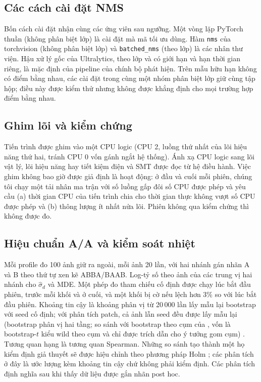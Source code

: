 \documentclass[a4paper,fleqn]{cas-dc}
\begin{document}
\subsection{Các cách cài đặt NMS}
Bốn cách cài đặt nhận cùng các ứng viên sau ngưỡng. Một vòng lặp PyTorch thuần (không phân biệt lớp) là cài đặt mà mã tối ưu dùng. Hàm \texttt{nms} của torchvision (không phân biệt lớp) và \texttt{batched\_nms} (theo lớp) là các nhân thư viện. Hậu xử lý gốc của Ultralytics, theo lớp và có giới hạn và hạn thời gian riêng, là mặc định của pipeline của chính bộ phát hiện. Trên mẫu hữu hạn không có điểm bằng nhau, các cài đặt trong cùng một nhóm phân biệt lớp giữ cùng tập hộp; điều này được kiểm thử nhưng không được khẳng định cho mọi trường hợp điểm bằng nhau.

\subsection{Ghim lõi và kiểm chứng}
Tiến trình được ghim vào một CPU logic (CPU 2, luồng thứ nhất của lõi hiệu năng thứ hai, tránh CPU 0 vốn gánh ngắt hệ thống). Ánh xạ CPU logic sang lõi vật lý, lõi hiệu năng hay tiết kiệm điện và SMT được đọc từ hệ điều hành. Việc ghim không bao giờ được giả định là hoạt động: ở đầu và cuối mỗi phiên, chúng tôi chạy một tải nhân ma trận với số luồng gấp đôi số CPU được phép và yêu cầu (a) thời gian CPU của tiến trình chia cho thời gian thực không vượt số CPU được phép và (b) thông lượng ít nhất nửa lõi. Phiên không qua kiểm chứng thì không được đo.

\subsection{Hiệu chuẩn A/A và kiểm soát nhiệt}
Mỗi profile đo 100 ảnh giữ ra ngoài, mỗi ảnh 20 lần, với hai nhánh gán nhãn A và B theo thứ tự xen kẽ ABBA/BAAB. Log-tỷ số theo ảnh của các trung vị hai nhánh cho $\hat\sigma_d$ và MDE. Một phép đo tham chiếu cố định được chạy lúc bắt đầu phiên, trước mỗi khối và ở cuối, và một khối bị cờ nếu lệch hơn 3\% so với lúc bắt đầu phiên. Khoảng tin cậy là khoảng phân vị từ 20\,000 lần lấy mẫu lại bootstrap với seed cố định; với phân tích patch, cả ảnh lẫn seed đều được lấy mẫu lại (bootstrap phân vị hai tầng; so sánh với bootstrap theo cụm của \cite{cameron2008cluster}, vốn là bootstrap-$t$ kiểu wild theo cụm và chỉ được trích dẫn cho ý tưởng gom cụm) \cite{efron1979bootstrap}. Tương quan hạng là tương quan Spearman. Những so sánh tạo thành một họ kiểm định giả thuyết sẽ được hiệu chỉnh theo phương pháp Holm \cite{holm1979}; các phân tích ở đây là ước lượng kèm khoảng tin cậy chứ không phải kiểm định. Các phân tích định nghĩa sau khi thấy dữ liệu được gắn nhãn post hoc.
\end{document}
